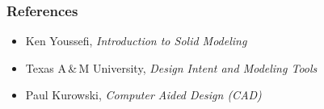 \begin{frame}[fragile]\frametitle{References}
\begin{itemize}
\item Ken Youssefi, \textit{Introduction to Solid Modeling}
\item Texas A\,\&\,M University, \textit{Design Intent and Modeling Tools}
\item Paul Kurowski, \textit{Computer Aided Design (CAD)}
\end{itemize}
\end{frame}
